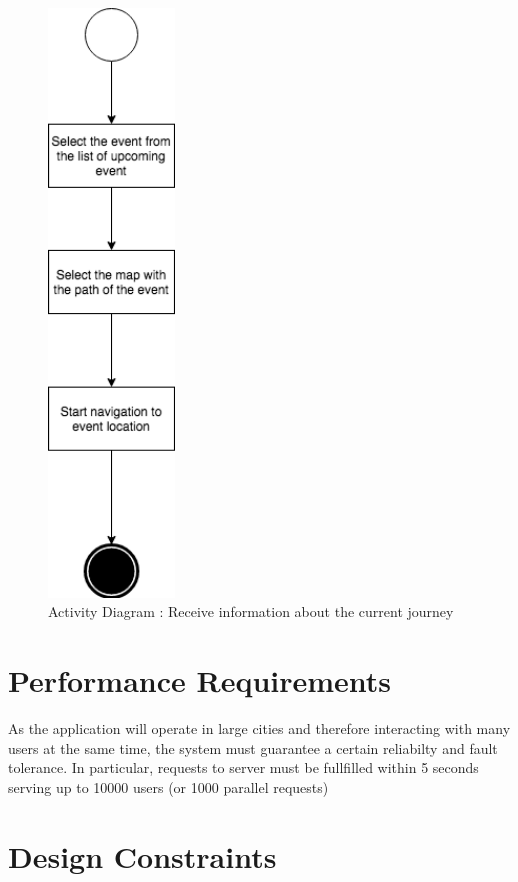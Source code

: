 \documentclass[numbers=noenddot, 12pt, a4paper, oneside]{scrbook}
\begin{document}
\newpage

\begin{figure}[H]
	\centering
	\includegraphics[width=0.3\textwidth]{flows/Scenario9}
	\caption{Activity Diagram : Receive information about the current journey}
\end{figure}
\newpage
\section{Performance Requirements}

As the application will operate in large cities and therefore interacting with many users at the same time, the system must guarantee a certain reliabilty and fault tolerance. In particular, requests to server must be fullfilled within 5 seconds serving up to 10000 users (or 1000 parallel requests)

\section{Design Constraints}
\end{document}
